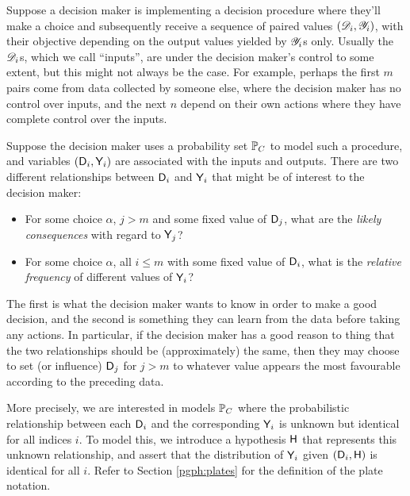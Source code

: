 Suppose a decision maker is implementing a decision procedure where they'll make a choice and subsequently receive a sequence of paired values $(\mathscr{D}_i,\mathscr{Y}_i)$, with their objective depending on the output values yielded by $\mathscr{Y}_i$s only. Usually the $\mathscr{D}_i$s, which we call ``inputs'', are under the decision maker's control to some extent, but this might not always be the case. For example, perhaps the first $m$ pairs come from data collected by someone else, where the decision maker has no control over inputs, and the next $n$ depend on their own actions where they have complete control over the inputs.

Suppose the decision maker uses a probability set $\mathbb{P}_C$ to model such a procedure, and variables $(\mathsf{D}_i,\mathsf{Y}_i)$ are associated with the inputs and outputs. There are two different relationships between $\mathsf{D}_i$ and $\mathsf{Y}_i$ that might be of interest to the decision maker:
\begin{itemize}
    \item For some choice $\alpha$, $j>m$ and some fixed value of $\mathsf{D}_j$, what are the \emph{likely consequences} with regard to $\mathsf{Y}_j$?
    \item For some choice $\alpha$, all $i\leq m$ with some fixed value of $\mathsf{D}_i$, what is the \emph{relative frequency} of different values of $\mathsf{Y}_i$?
\end{itemize}
The first is what the decision maker wants to know in order to make a good decision, and the second is something they can learn from the data before taking any actions. In particular, if the decision maker has a good reason to thing that the two relationships should be (approximately) the same, then they may choose to set (or influence) $\mathsf{D}_j$ for $j>m$ to whatever value appears the most favourable according to the preceding data.

More precisely, we are interested in models $\mathbb{P}_C$ where the probabilistic relationship between each $\mathsf{D}_i$ and the corresponding $\mathsf{Y}_i$ is unknown but identical for all indices $i$. To model this, we introduce a hypothesis $\mathsf{H}$ that represents this unknown relationship, and assert that the distribution of $\mathsf{Y}_i$ given $(\mathsf{D}_i,\mathsf{H})$ is identical for all $i$. Refer to Section \ref{pgph:plates} for the definition of the plate notation.

